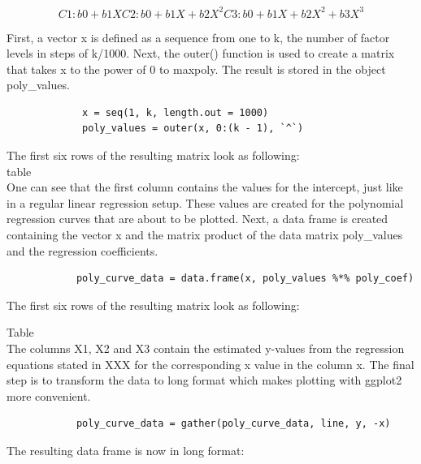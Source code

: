 \documentclass[11pt]{article}
\begin{document}
		\begin{equation}
		C1: b0 + b1X
		C2: b0 + b1X + b2X^2
		C3: b0 + b1X + b2X^2 + b3X^3
		\end{equation}
		
		First, a vector x is defined as a sequence from one to k, the number of factor levels in steps of k/1000. Next, the outer() function is used to create a matrix that takes x to the power of 0 to maxpoly. The result is stored in the object poly\_values.\\
		
		\begin{lstlisting}
			 x = seq(1, k, length.out = 1000)
			 poly_values = outer(x, 0:(k - 1), `^`)
		\end{lstlisting}
		
		The first six rows of the resulting matrix look as following:\\
		
		
		table\\
		
		
		One can see that the first column contains the values for the intercept, just like in a regular linear regression setup. These values are created for the polynomial regression curves that are about to be plotted. Next, a data frame is created containing the vector x and the matrix product of the data matrix poly\_values and the regression coefficients.\\
		
		\begin{lstlisting}
			poly_curve_data = data.frame(x, poly_values %*% poly_coef)
		\end{lstlisting}
		
		The first six rows of the resulting matrix look as following:
		
		Table\\
		
		The columns X1, X2 and X3 contain the estimated y-values from the regression equations stated in XXX for the corresponding x value in the column x.
		The final step is to transform the data to long format which makes plotting with ggplot2 more convenient.\\
		
		\begin{lstlisting}
			poly_curve_data = gather(poly_curve_data, line, y, -x)
		\end{lstlisting}
		
		The resulting data frame is now in long format:\\
		
\end{document}
